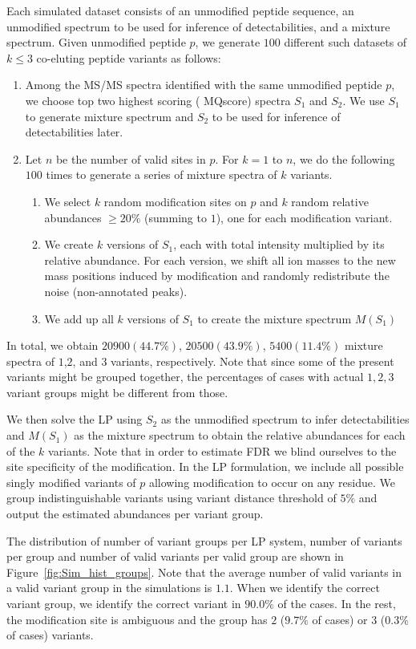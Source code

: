Each simulated dataset consists of an unmodified peptide sequence, an unmodified spectrum to be used for inference of detectabilities, and a mixture spectrum. Given unmodified peptide $p$, we generate $100$ different such datasets of $k \leq 3$ co-eluting peptide variants as follows:
\begin{enumerate}
\item Among the MS/MS spectra identified with the same unmodified peptide $p$, we choose top two highest scoring ({\inspect} MQscore) spectra $S_1$ and $S_2$. We use $S_1$ to generate mixture spectrum and $S_2$ to be used for inference of detectabilities later.
\item Let $n$ be the number of valid sites in $p$. For $k=1$ to $n$, we do the following $100$ times to generate a series of mixture spectra of $k$ variants.
\begin{enumerate}
\item We select $k$ random modification sites on $p$ and $k$ random relative abundances $\ge 20\%$ (summing to $1$), one for each modification variant.
\item We create $k$ versions of $S_1$, each with total intensity multiplied by its relative abundance. For each version, we shift all ion masses to the new mass positions induced by modification and randomly redistribute the noise (non-annotated peaks).
\item We add up all $k$ versions of $S_1$ to create the mixture spectrum $M(S_1)$
\end{enumerate}
\end{enumerate}
In total, we obtain $20900 (44.7\%)$, $20500 (43.9\%)$, $5400 (11.4\%)$ mixture spectra of $1$,$2$, and $3$ variants, respectively. Note that since some of the present variants might be grouped together, the percentages of cases with actual $1,2,3$ variant groups might be different from those.

We then solve the LP using $S_2$ as the unmodified spectrum to infer detectabilities and $M(S_1)$ as the mixture spectrum to obtain the relative abundances for each of the $k$ variants. Note that in order to estimate FDR we blind ourselves to the site specificity of the modification. In the LP formulation, we include all possible singly modified variants of $p$ allowing modification to occur on any residue. We group indistinguishable variants using variant distance threshold of $5\%$ and output the estimated abundances per variant group.

The distribution of number of variant groups per LP system, number of variants per group and number of valid variants per valid group are shown in Figure~\ref{fig:Sim_hist_groups}. Note that the average number of valid variants in a valid variant group in the simulations is $1.1$. When we identify the correct variant group, we identify the correct variant in $90.0\%$ of the cases. In the rest, the modification site is ambiguous and the group has $2$ ($9.7\%$ of cases) or $3$ ($0.3\%$ of cases) variants.


